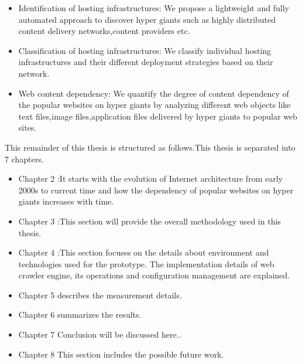 \begin{itemize}
\item Identification of hosting infrastructures: We propose a lightweight and
fully automated approach to discover hyper giants such as highly distributed
content delivery networks,content providers etc.

\item Classification of hosting infrastructures: We classify individual hosting
infrastructures and their different deployment strategies based on their
network.

\item Web content dependency: We quantify the degree of content dependency
of the popular websites on hyper giants by analyzing different web objects like text files,image files,application files delivered by hyper giants to popular web sites.
\end{itemize}

This remainder of this thesis is structured as follows.This thesis is separated
into 7 chapters.

\begin{itemize}
\item Chapter 2 :It starts with the evolution of Internet architecture from early
2000s to current time and how the dependency of popular websites on
hyper giants increases with time.
\item Chapter 3 :This section will provide the overall methodology used in this
thesis.
\item Chapter 4 :This section focuses on the details about environment and technologies used for the prototype. The implementation details of web crawler
engine, its operations and configuration management are explained.
\item Chapter 5 describes the measurement details.
\item Chapter 6 summarizes the results.
\item Chapter 7 Conclusion will be discussed here..
\item Chapter 8 This section includes the possible future work.
\end{itemize}
